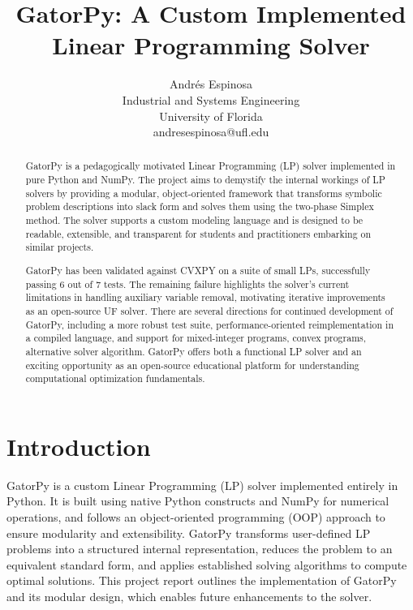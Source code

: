 \documentclass[conference]{IEEEtran}
\begin{document}
\title{GatorPy: A Custom Implemented Linear Programming Solver}

\author{
    \begin{minipage}{0.50\textwidth}
        \centering
        \textcolor{uf_blue}{Andrés Espinosa} \\
        \textcolor{uf_orange}{Industrial and Systems Engineering} \\
        \textcolor{uf_orange}{University of Florida} \\
        \textcolor{uf_orange}{andresespinosa@ufl.edu} \\ 
    \end{minipage}
}


\maketitle


\begin{abstract}
GatorPy is a pedagogically motivated Linear Programming (LP) solver implemented in pure Python and NumPy. 
The project aims to demystify the internal workings of LP solvers by providing a modular, object-oriented framework that transforms symbolic problem descriptions into slack form and solves them using the two-phase Simplex method. 
The solver supports a custom modeling language and is designed to be readable, extensible, and transparent for students and practitioners embarking on similar projects. 

GatorPy has been validated against CVXPY on a suite of small LPs, successfully passing 6 out of 7 tests. 
The remaining failure highlights the solver's current limitations in handling auxiliary variable removal, motivating iterative improvements as an open-source UF solver. 
There are several directions for continued development of GatorPy, including a more robust test suite, performance-oriented reimplementation in a compiled language, and support for mixed-integer programs, convex programs, alternative solver algorithm. 
GatorPy offers both a functional LP solver and an exciting opportunity as an open-source educational platform for understanding computational optimization fundamentals.    
\end{abstract}

\IEEEpeerreviewmaketitle

\section{Introduction}
\label{sse:introduction}
GatorPy is a custom Linear Programming (LP) solver implemented entirely in Python. 
It is built using native Python constructs and NumPy for numerical operations, and follows an object-oriented programming (OOP) approach to ensure modularity and extensibility. 
GatorPy transforms user-defined LP problems into a structured internal representation, reduces the problem to an equivalent standard form, and applies established solving algorithms to compute optimal solutions.
This project report outlines the implementation of GatorPy and its modular design, which enables future enhancements to the solver. 
\end{document}
